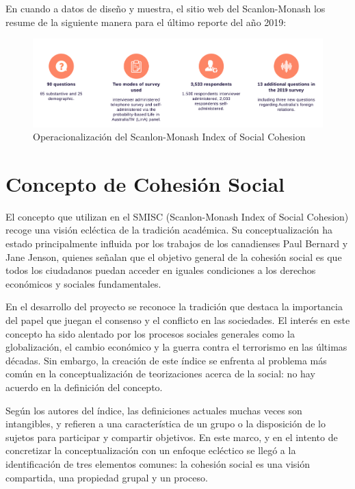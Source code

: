 \documentclass[
  12pt,
]{book}
\begin{document}
En cuando a datos de diseño y muestra, el sitio web del Scanlon-Monash los resume de la siguiente manera para el último reporte del año 2019:

\begin{figure}[H]

{\centering \includegraphics[width=0.75\linewidth]{inputs/images/scanlon2019} 

}

\caption{Operacionalización del Scanlon-Monash Index of Social Cohesion}\label{fig:mapping2}
\end{figure}

\hypertarget{concepto-de-cohesiuxf3n-social-1}{%
\section{Concepto de Cohesión Social}\label{concepto-de-cohesiuxf3n-social-1}}

El concepto que utilizan en el SMISC (Scanlon-Monash Index of Social Cohesion) recoge una visión ecléctica de la tradición académica. Su conceptualización ha estado principalmente influida por los trabajos de los canadienses Paul Bernard y Jane Jenson, quienes señalan que el objetivo general de la cohesión social es que todos los ciudadanos puedan acceder en iguales condiciones a los derechos económicos y sociales fundamentales.

En el desarrollo del proyecto se reconoce la tradición que destaca la importancia del papel que juegan el consenso y el conflicto en las sociedades. El interés en este concepto ha sido alentado por los procesos sociales generales como la globalización, el cambio económico y la guerra contra el terrorismo en las últimas décadas. Sin embargo, la creación de este índice se enfrenta al problema más común en la conceptualización de teorizaciones acerca de la social: no hay acuerdo en la definición del concepto.

Según los autores del índice, las definiciones actuales muchas veces son intangibles, y refieren a una característica de un grupo o la disposición de lo sujetos para participar y compartir objetivos. En este marco, y en el intento de concretizar la conceptualización con un enfoque ecléctico se llegó a la identificación de tres elementos comunes: la cohesión social es una visión compartida, una propiedad grupal y un proceso.
\end{document}
